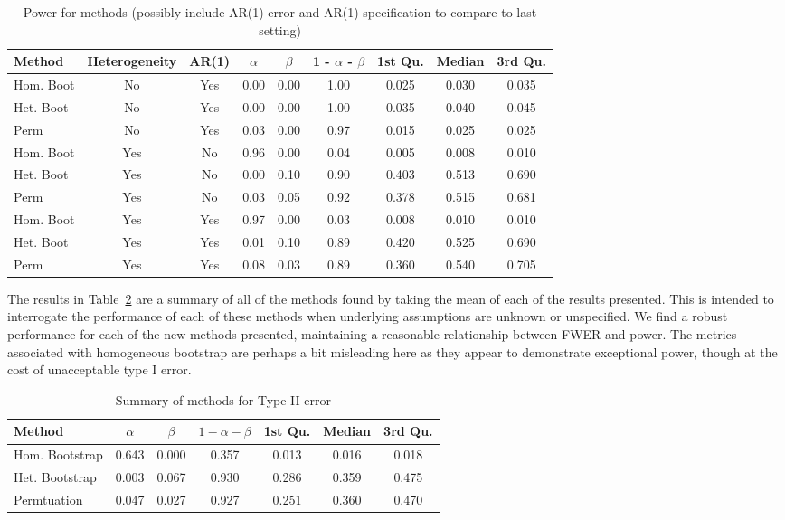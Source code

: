 \begin{table}[H]
\centering
\begin{tabular}{lcccccccc}
  \hline
Method & Heterogeneity & AR(1) & $\alpha$ & $\beta$ & 1 - $\alpha$ - $\beta$ & 1st Qu. & Median & 3rd Qu. \\ 
  \hline
Hom. Boot & No & Yes & 0.00 & 0.00 & 1.00 & 0.025 & 0.030 & 0.035 \\ 
  Het. Boot & No & Yes & 0.00 & 0.00 & 1.00 & 0.035 & 0.040 & 0.045 \\ 
  Perm & No & Yes & 0.03 & 0.00 & 0.97 & 0.015 & 0.025 & 0.025 \\ 
  \hline
  Hom. Boot & Yes & No & 0.96 & 0.00 & 0.04 & 0.005 & 0.008 & 0.010 \\ 
  Het. Boot & Yes & No & 0.00 & 0.10 & 0.90 & 0.403 & 0.513 & 0.690 \\ 
  Perm & Yes & No & 0.03 & 0.05 & 0.92 & 0.378 & 0.515 & 0.681 \\ 
  \hline
  Hom. Boot & Yes & Yes & 0.97 & 0.00 & 0.03 & 0.008 & 0.010 & 0.010 \\ 
  Het. Boot & Yes & Yes & 0.01 & 0.10 & 0.89 & 0.420 & 0.525 & 0.690 \\ 
  Perm & Yes & Yes & 0.08 & 0.03 & 0.89 & 0.360 & 0.540 & 0.705 \\ 
   \hline
\end{tabular}
\caption{Power for methods (possibly include AR(1) error and AR(1) specification to compare to last setting)} 
\label{tab:power_methods}
\end{table}

The results in Table~\ref{tab:type_2_summary} are a summary of all of the methods found by taking the mean of each of the results presented. This is intended to interrogate the performance of each of these methods when underlying assumptions are unknown or unspecified. We find a robust performance for each of the new methods presented, maintaining a reasonable relationship between FWER and power. The metrics associated with homogeneous bootstrap are perhaps a bit misleading here as they appear to demonstrate exceptional power, though at the cost of unacceptable type I error.

\begin{table}[ht]
\centering
\begin{tabular}{lcccccc}
  \hline
Method & $\alpha$ & $\beta$ & $1 - \alpha - \beta$ & 1st Qu. & Median & 3rd Qu. \\ 
  \hline
Hom. Bootstrap & 0.643 & 0.000 & 0.357 & 0.013 & 0.016 & 0.018 \\ 
  Het. Bootstrap & 0.003 & 0.067 & 0.930 & 0.286 & 0.359 & 0.475 \\ 
  Permtuation & 0.047 & 0.027 & 0.927 & 0.251 & 0.360 & 0.470 \\ 
   \hline
\end{tabular}
\caption{Summary of methods for Type II error} 
\label{tab:type_2_summary}
\end{table}

